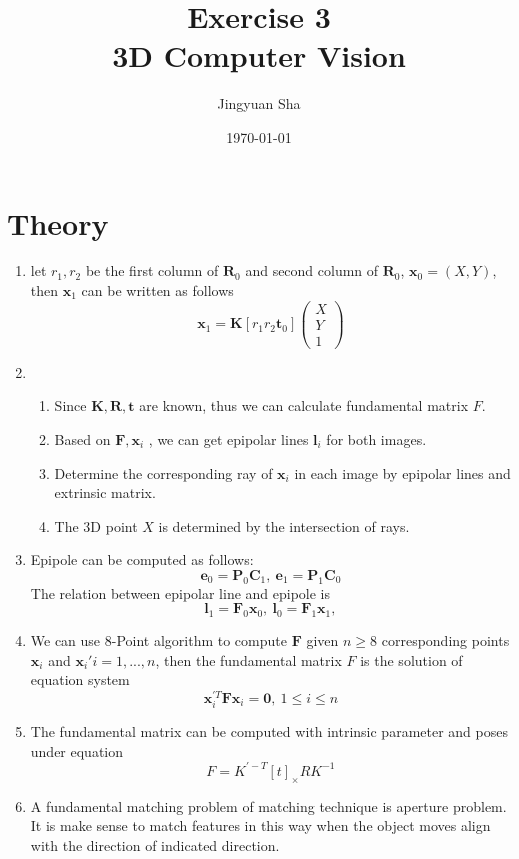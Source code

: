 \documentclass[a4paper, twoside, english]{article}
\title{Exercise 3 \\ 3D Computer Vision}  %
\author{Jingyuan Sha}                       %
\date{\today}                              %
\begin{document}
\maketitle


\section{Theory}

\begin{enumerate}
	\item let $ r_1, r_2$ be the first column of $ \textbf{R}_0 $ and second column of $ \textbf{R}_0 $, $ \textbf{x}_0 = (X,Y)$, then $ \textbf{x}_1 $ can be written as follows
	\begin{equation*}
		\textbf{x}_1 = \textbf{K}[r_1r_2\textbf{t}_0]\left(\begin{matrix}
			X\\
			Y\\
			1
		\end{matrix}\right)
	\end{equation*}
	\item \begin{enumerate}
		\item Since $ \textbf{K}, \textbf{R}, \textbf{t} $ are known, thus we can calculate fundamental matrix $ F $.
		\item Based on $ \textbf{F},  \textbf{x}_i $ , we can get epipolar lines $ \textbf{l}_i $ for both images.
		\item Determine the corresponding ray of $ \textbf{x}_i $ in each image by epipolar lines and extrinsic matrix. 
		\item The 3D point $ X $ is determined by the intersection of rays.
	\end{enumerate}
	\item Epipole can be computed as follows:
	\begin{equation*}
		\textbf{e}_0 = \textbf{P}_0\textbf{C}_1, \ 
		\textbf{e}_1 = \textbf{P}_1\textbf{C}_0
	\end{equation*}
	The relation between epipolar line and epipole is
	\begin{equation*}
		\textbf{l}_1 = \textbf{F}_0\textbf{x}_0, \ 
		\textbf{l}_0 = \textbf{F}_1\textbf{x}_1,
	\end{equation*}
	\item We can use 8-Point algorithm to compute $ \textbf{F} $ given $ n\geq 8 $ corresponding points $ \textbf{x}_i $ and $ \textbf{x}_i' i=1,...,n$, then the fundamental matrix $ F $ is the solution of equation system
	\begin{equation}
		\textbf{x}_i^{'T}\textbf{F}\textbf{x}_i = \textbf{0},\  1\leq i \leq n
	\end{equation}
	\item The fundamental matrix can be computed with intrinsic parameter and poses under equation
	\begin{equation*}
		F = K^{'-T}[t]_{\times}RK^{-1}
	\end{equation*}
	\item A fundamental matching problem of matching technique is aperture problem. It is make sense to match features in this way when the object moves align with the direction of indicated direction.
	
\end{enumerate}


\newpage
\end{document}
